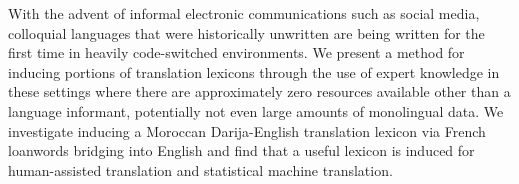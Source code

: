 With the advent of informal electronic communications such as social media, colloquial languages that were historically unwritten are being written for the first time in heavily code-switched environments. We present a method for inducing portions of translation lexicons through the use of expert knowledge in these settings where there are approximately zero resources available other than a language informant, potentially not even large amounts of monolingual data. We investigate inducing a Moroccan Darija-English translation lexicon via French loanwords bridging into English and find that a useful lexicon is induced for human-assisted translation and statistical machine translation.
